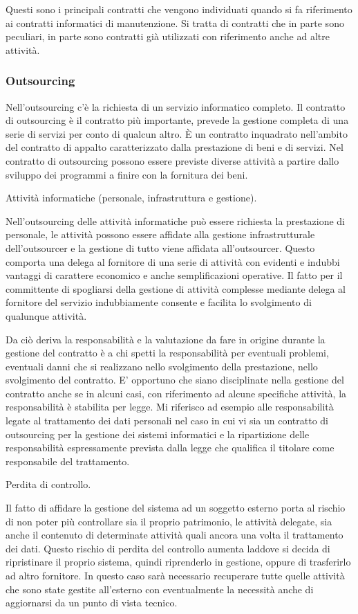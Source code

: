 Questi sono i principali contratti che vengono individuati quando si fa riferimento ai contratti informatici di manutenzione. Si tratta di contratti che in parte sono peculiari, in parte sono contratti già utilizzati con riferimento anche ad altre attività. 

\subsubsection{Outsourcing}
Nell'outsourcing c'è la richiesta di un servizio informatico completo. Il contratto di outsourcing è il contratto più importante, prevede la gestione completa di una serie di servizi per conto di qualcun altro. È un contratto inquadrato nell'ambito del contratto di appalto caratterizzato dalla prestazione di beni e di servizi. Nel contratto di outsourcing possono essere previste diverse attività a partire dallo sviluppo dei programmi a finire con la fornitura dei beni. 

Attività informatiche (personale, infrastruttura e gestione). 

Nell'outsourcing delle attività informatiche può essere richiesta la prestazione di personale, le attività possono essere affidate alla gestione infrastrutturale dell'outsourcer e la gestione di tutto viene affidata all'outsourcer. Questo comporta una delega al fornitore di una serie di attività con evidenti e indubbi vantaggi di carattere economico e anche semplificazioni operative. Il fatto per il committente di spogliarsi della gestione di attività complesse mediante delega al fornitore del servizio indubbiamente consente e facilita lo svolgimento di qualunque attività. 

Da ciò deriva la responsabilità e la valutazione da fare in origine durante la gestione del contratto è a chi spetti la responsabilità per eventuali problemi, eventuali danni che si realizzano nello svolgimento della prestazione, nello svolgimento del contratto. E' opportuno che siano disciplinate nella gestione del contratto anche se in alcuni casi, con riferimento ad alcune specifiche attività, la responsabilità è stabilita per legge. Mi riferisco ad esempio alle responsabilità legate al trattamento dei dati personali nel caso in cui vi sia un contratto di outsourcing per la gestione dei sistemi informatici e la ripartizione delle responsabilità espressamente prevista dalla legge che qualifica il titolare come responsabile del trattamento. 

Perdita di controllo. 

Il fatto di affidare la gestione del sistema ad un soggetto esterno porta al rischio di non poter più controllare sia il proprio patrimonio, le attività delegate, sia anche il contenuto di determinate attività quali ancora una volta il trattamento dei dati. Questo rischio di perdita del controllo aumenta laddove si decida di ripristinare il proprio sistema, quindi riprenderlo in gestione, oppure di trasferirlo ad altro fornitore. In questo caso sarà necessario recuperare tutte quelle attività che sono state gestite all'esterno con eventualmente la necessità anche di aggiornarsi da un punto di vista tecnico. 

